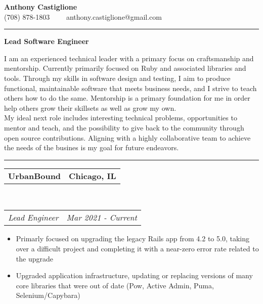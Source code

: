 \documentclass[10pt,letterpaper]{article}
\makeatletter
\newcommand{\headerrow}[2]
{\begin{tabular*}{\linewidth}{l@{\extracolsep{\fill}}r}
  #1 &
  #2 \\
\end{tabular*}}
\newenvironment{indentsection}[1]%
{\begin{list}{}%
  {\setlength{\leftmargin}{#1}}%
  \item[]%
}
{\end{list}}
\makeatother
\begin{document}
\begin{center}
  {\LARGE \textbf {Anthony Castiglione}} \\ (708) 878-1803 \ \ \textbullet \ \ anthony.castiglione@gmail.com
\end{center}
\hrule
\begin{center}
  {\Large \textbf {Lead Software Engineer}}
\end{center}
\par I am an experienced technical leader with a primary focus on craftsmanship and mentorship. Currently primarily focused on Ruby and associated libraries and tools. Through my skills in software design and testing, I aim to produce functional, maintainable software that meets business needs, and I strive to teach others how to do the same. Mentorship is a primary foundation for me in order help others grow their skillsets as well as grow my own.
\noindent \mbox{}\\

My ideal next role includes interesting technical problems, opportunities to mentor and teach, and the possibility to give back to the community through open source contributions. Aligning with a highly collaborative team to achieve the needs of the busines is my goal for future endeavors.

\vspace{0.2in}
\hrule
\vspace{0.2in}


\begin{indentsection}{\parindent}
  \headerrow
    {\textbf{UrbanBound} }
    {\textbf{Chicago, IL}}
  \\
  \headerrow
    {\emph{Lead Engineer}}
    {\emph{Mar 2021 - Current}}

  \begin{itemize}
  \renewcommand{\labelitemi}{$-$}
  \vspace{-0.1in}
    \item Primarly focused on upgrading the legacy Rails app from 4.2 to 5.0, taking over a difficult project and completing it with a near-zero error rate related to the upgrade
    \item Upgraded application infrastructure, updating or replacing versions of many core libraries that were out of date (Pow, Active Admin, Puma, Selenium/Capybara)
  \end{itemize}
\end{indentsection}
\end{document}
